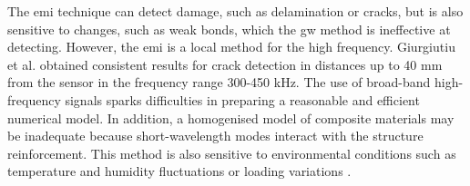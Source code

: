The \ac{emi} technique can detect damage, such as delamination or cracks, but is also sensitive to changes, such as weak bonds, which the \ac{gw} method is ineffective at detecting.
However, the \ac{emi} is a local method for the high frequency.
Giurgiutiu et al. \cite{giurgiutiu2001electro} obtained consistent results for crack detection in distances up to 40 \unit{\mm} from the sensor in the frequency range 300-450 \unit{\kHz}.
The use of broad-band high-frequency signals sparks difficulties in preparing a reasonable and efficient numerical model.
In addition, a homogenised model of composite materials may be inadequate because short-wavelength modes interact with the structure reinforcement.
This method is also sensitive to environmental conditions such as temperature and humidity fluctuations \cite{bhalla2002practical} or loading variations \cite{lim2011impedance}.

